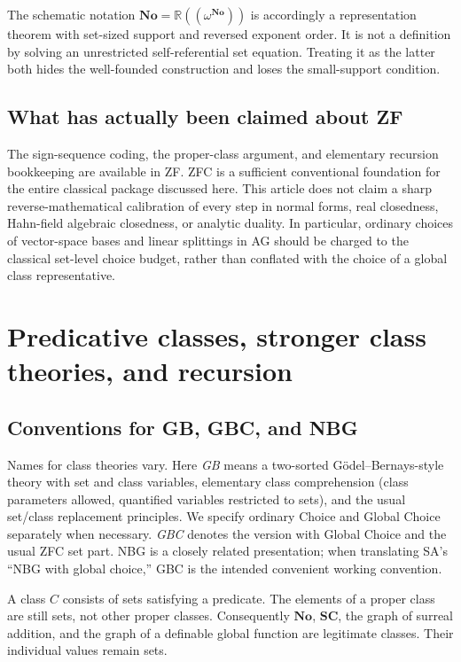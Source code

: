 \documentclass[11pt,letterpaper]{article}
\theoremstyle{definition}
\theoremstyle{remark}
\newcommand{\No}{\mathbf{No}}
\newcommand{\SC}{\mathbf{SC}}
\newcommand{\R}{\mathbb R}
\numberwithin{equation}{section}
\begin{document}
The schematic notation \(\No=\R((\omega^{\No}))\) is accordingly a representation theorem with set-sized support and reversed exponent order. It is not a definition by solving an unrestricted self-referential set equation. Treating it as the latter both hides the well-founded construction and loses the small-support condition.

\subsection{What has actually been claimed about ZF}
The sign-sequence coding, the proper-class argument, and elementary recursion bookkeeping are available in ZF. ZFC is a sufficient conventional foundation for the entire classical package discussed here. This article does not claim a sharp reverse-mathematical calibration of every step in normal forms, real closedness, Hahn-field algebraic closedness, or analytic duality. In particular, ordinary choices of vector-space bases and linear splittings in AG should be charged to the classical set-level choice budget, rather than conflated with the choice of a global class representative.

\section{Predicative classes, stronger class theories, and recursion}\label{sec:classes}

\subsection{Conventions for GB, GBC, and NBG}
Names for class theories vary. Here \emph{GB} means a two-sorted G\"odel--Bernays-style theory with set and class variables, elementary class comprehension (class parameters allowed, quantified variables restricted to sets), and the usual set/class replacement principles. We specify ordinary Choice and Global Choice separately when necessary. \emph{GBC} denotes the version with Global Choice and the usual ZFC set part. NBG is a closely related presentation; when translating SA's ``NBG with global choice,'' GBC is the intended convenient working convention.

A class \(C\) consists of sets satisfying a predicate. The elements of a proper class are still sets, not other proper classes. Consequently \(\No\), \(\SC\), the graph of surreal addition, and the graph of a definable global function are legitimate classes. Their individual values remain sets.
\end{document}
